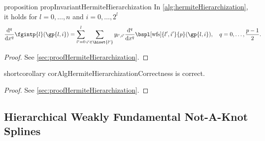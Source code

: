 \begin{restatable}{%
  proposition%
}{%
  propInvariantHermiteHierarchization%
}
  \label{prop:invariantHermiteHierarchization}
  In \cref{alg:hermiteHierarchization}, it holds
  for $l = 0, \dotsc, n$ and $i = 0, \dotsc, 2^l$
  \begin{equation}
    \label{eq:propInvariantHermiteHierarchization}
    \frac{\diff^q}{\dx^q} \fgintp{l}(\gp{l,i})
    = \sum_{l'=0}^l \sum_{i' \in \hiset{l'}}
    \linout{l',i'} \frac{\diff^q}{\dx^q}
    \bspl[\wfs]{l',i'}{p}(\gp{l,i}),\quad
    q = 0, \dotsc, \frac{p-1}{2}.
    \hspace*{-6mm}
  \end{equation}
\end{restatable}

\begin{proof}
  See \cref{sec:proofHermiteHierarchization}.
\end{proof}

\begin{restatable}{%
  shortcorollary%
}{%
  corAlgHermiteHierarchizationCorrectness%
}
  \label{cor:algHermiteHierarchizationCorrectness}
   is correct.
\end{restatable}

\begin{proof}
  See \cref{sec:proofHermiteHierarchization}.
\end{proof}



\subsection{Hierarchical Weakly Fundamental Not-A-Knot Splines}
\label{sec:456wfsNotAKnot}

